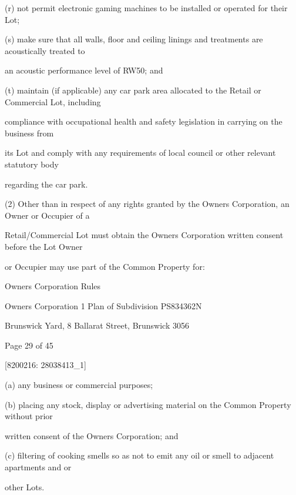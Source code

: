 \documentclass{article}
\begin{document}
{\fontsize{9.962}{1}(r) not permit electronic gaming machines to be installed or operated for their Lot; }

{\fontsize{9.962}{1}(s) make sure that all walls, floor and ceiling linings and treatments are acoustically treated to }

{\fontsize{10.02}{1}an acoustic performance level of RW50; and }

{\fontsize{9.962}{1}(t) maintain (if applicable) any car park area allocated to the Retail or Commercial Lot, including }

{\fontsize{10.02}{1}compliance with occupational health and safety legislation in carrying on the business from }

{\fontsize{10.02}{1}its Lot and comply with any requirements of local council or other relevant statutory body }

{\fontsize{10.02}{1}regarding the car park. }

{\fontsize{9.962}{1}(2) Other than in respect of any rights granted by the Owners Corporation, an Owner or Occupier of a }

{\fontsize{10.02}{1}Retail/Commercial Lot must obtain the Owners Corporation written consent before the Lot Owner }

{\fontsize{10.02}{1}or Occupier may use part of the Common Property for: }

\newpage





{\fontsize{9}{1}Owners Corporation Rules }

{\fontsize{9}{1}Owners Corporation 1 Plan of Subdivision PS834362N }

{\fontsize{9}{1}Brunswick Yard, 8 Ballarat Street, Brunswick 3056 }


{\fontsize{9}{1}Page 29  of 45 }



{\fontsize{7.02}{1}[8200216: 28038413\_1] }

{\fontsize{9.962}{1}(a) any business or commercial purposes; }

{\fontsize{9.962}{1}(b) placing any stock, display or advertising material on the Common Property without prior }

{\fontsize{10.02}{1}written consent of the Owners Corporation; and }

{\fontsize{9.962}{1}(c) filtering of cooking smells so as not to emit any oil or smell to adjacent apartments and or }

{\fontsize{10.02}{1}other Lots. }
\end{document}
